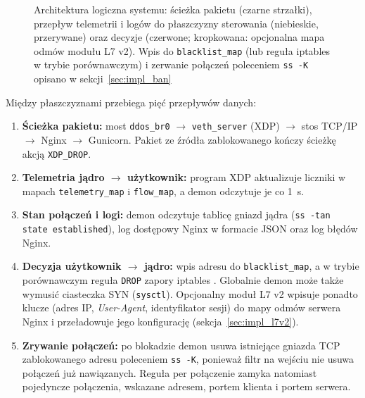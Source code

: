 \documentclass[a4paper,12pt]{article}
\begin{document}
\begin{figure}[H]
\caption{Architektura logiczna systemu: ścieżka pakietu (czarne strzałki), przepływ telemetrii i logów do płaszczyzny sterowania (niebieskie, przerywane) oraz decyzje (czerwone; kropkowana: opcjonalna mapa odmów modułu L7 v2). Wpis do \texttt{blacklist\_map} (lub reguła iptables w trybie porównawczym) i zerwanie połączeń poleceniem \texttt{ss -K} opisano w sekcji~\ref{sec:impl_ban}}
\label{fig:architektura}
\end{figure}

Między płaszczyznami przebiega pięć przepływów danych:
\begin{enumerate}
    \item \textbf{Ścieżka pakietu:} most \texttt{ddos\_br0} $\rightarrow$ \texttt{veth\_server} (XDP) $\rightarrow$ stos TCP/IP $\rightarrow$ Nginx $\rightarrow$ Gunicorn. Pakiet ze źródła zablokowanego kończy ścieżkę akcją \texttt{XDP\_DROP}.
    \item \textbf{Telemetria jądro $\rightarrow$ użytkownik:} program XDP aktualizuje liczniki w mapach \texttt{telemetry\_map} i \texttt{flow\_map}, a demon odczytuje je co 1~s.
    \item \textbf{Stan połączeń i logi:} demon odczytuje tablicę gniazd jądra (\texttt{ss -tan state established}), log dostępowy Nginx w formacie JSON oraz log błędów Nginx.
    \item \textbf{Decyzja użytkownik $\rightarrow$ jądro:} wpis adresu do \texttt{blacklist\_map}, a w trybie porównawczym reguła \texttt{DROP} zapory iptables \cite{iptables_ext}. Globalnie demon może także wymusić ciasteczka SYN (\texttt{sysctl}). Opcjonalny moduł L7 v2 wpisuje ponadto klucze (adres IP, \textit{User-Agent}, identyfikator sesji) do mapy odmów serwera Nginx i przeładowuje jego konfigurację (sekcja~\ref{sec:impl_l7v2}).
    \item \textbf{Zrywanie połączeń:} po blokadzie demon usuwa istniejące gniazda TCP zablokowanego adresu poleceniem \texttt{ss -K}, ponieważ filtr na wejściu nie usuwa połączeń już nawiązanych. Reguła per połączenie zamyka natomiast pojedyncze połączenia, wskazane adresem, portem klienta i portem serwera.
\end{enumerate}
\end{document}
